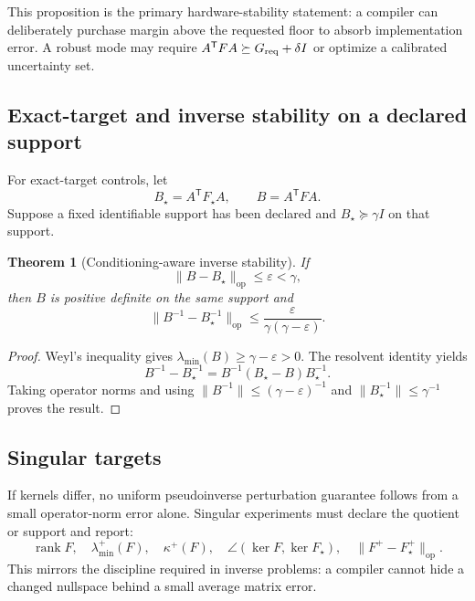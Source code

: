 \documentclass[11pt]{article}
\newtheorem{theorem}{Theorem}[section]
\theoremstyle{definition}
\theoremstyle{remark}
\newcommand{\rank}{\operatorname{rank}}
\newcommand{\kernel}{\operatorname{ker}}
\newcommand{\op}{\mathrm{op}}
\newcommand{\eps}{\varepsilon}
\begin{document}
This proposition is the primary hardware-stability statement: a compiler can deliberately purchase margin above the requested floor to absorb implementation error. A robust mode may require $A^{\mathsf T}FA\succeq G_{\rm req}+\delta I$ or optimize a calibrated uncertainty set.

\subsection{Exact-target and inverse stability on a declared support}
For exact-target controls, let
\begin{equation}
  B_\star=A^{\mathsf T}F_\star A,
  \qquad
  B=A^{\mathsf T}FA.
\end{equation}
Suppose a fixed identifiable support has been declared and $B_\star\succeq\gamma I$ on that support.

\begin{theorem}[Conditioning-aware inverse stability]
\label{thm:inverse-stability}
If
\begin{equation}
  \|B-B_\star\|_{\op}\le\eps<\gamma,
  \label{eq:inverse-assumption}
\end{equation}
then $B$ is positive definite on the same support and
\begin{equation}
  \|B^{-1}-B_\star^{-1}\|_{\op}
  \le\frac{\eps}{\gamma(\gamma-\eps)}.
  \label{eq:inverse-stability}
\end{equation}
\end{theorem}

\begin{proof}
Weyl's inequality gives $\lambda_{\min}(B)\ge\gamma-\eps>0$. The resolvent identity yields
\begin{equation}
  B^{-1}-B_\star^{-1}=B^{-1}(B_\star-B)B_\star^{-1}.
\end{equation}
Taking operator norms and using $\|B^{-1}\|\le(\gamma-\eps)^{-1}$ and $\|B_\star^{-1}\|\le\gamma^{-1}$ proves the result.
\end{proof}

\subsection{Singular targets}
If kernels differ, no uniform pseudoinverse perturbation guarantee follows from a small operator-norm error alone. Singular experiments must declare the quotient or support and report:
\begin{equation}
  \rank F,
  \quad\lambda_{\min}^{+}(F),
  \quad\kappa^{+}(F),
  \quad\angle(\kernel F,\kernel F_\star),
  \quad\|F^{+}-F_\star^{+}\|_{\op}.
  \label{eq:singular-metrics}
\end{equation}
This mirrors the discipline required in inverse problems: a compiler cannot hide a changed nullspace behind a small average matrix error.
\end{document}
